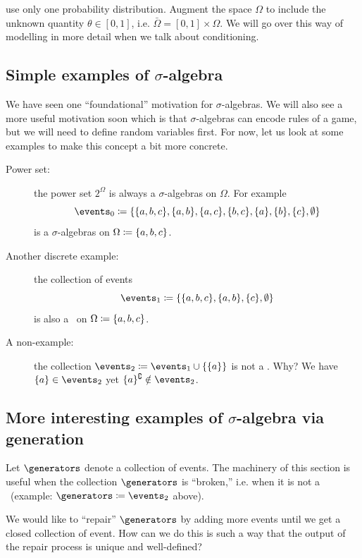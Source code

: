\documentclass{article}
\begin{document}
 use only one probability distribution. Augment the space $\Omega$ to include the unknown quantity $\theta \in [0, 1]$, i.e. $\bar \Omega = [0, 1] \times \Omega$. We will go over this way of modelling in more detail when we talk about conditioning.


\subsection{Simple examples of $\sigma$-algebra}

We have seen one ``foundational'' motivation for $\sigma$-algebras. We will also see a more useful motivation soon which is that $\sigma$-algebras can encode rules of a game, but we will need to define random variables first. For now, let us look at some examples to make this concept a bit more concrete.

\begin{description}
  \item[Power set:] the power set $2^\Omega$ is always a $\sigma$-algebras on $\Omega$. For example \[\events_0 \defeq \{\{a, b, c\}, \{a, b\}, \{a, c\}, \{b, c\}, \{a\}, \{b\}, \{c\}, \emptyset\}\] is a $\sigma$-algebras on $\Omega \coloneqq \{a, b, c\}$.
  \item[Another discrete example:] the collection of events \[\events_1 \defeq \{\{a, b, c\}, \{a, b\}, \{c\}, \emptyset\}\] is also a \sigmaalg\ on $\Omega \coloneqq \{a, b, c\}$.
  \item[A non-example:] the collection $\events_2 \defeq \events_1 \cup \{\{a\}\}$ is not a \sigmaalg. Why? We have $\{a\} \in \events_2$ yet $\{a\}^\complement \notin \events_2$.
\end{description}


\subsection{More interesting examples of $\sigma$-algebra via generation}\label{sec:generated}

Let $\generators$ denote a collection of events. The machinery of this section is useful when the collection $\generators$ is ``broken,'' i.e. when it is not  a \sigmaalg\ (example: $\generators \defeq \events_2$ above). 

We would like to ``repair'' $\generators$ by adding more events until we get a closed collection of event. How can we do this is such a way that the output of the repair process is unique and well-defined? 
\end{document}
